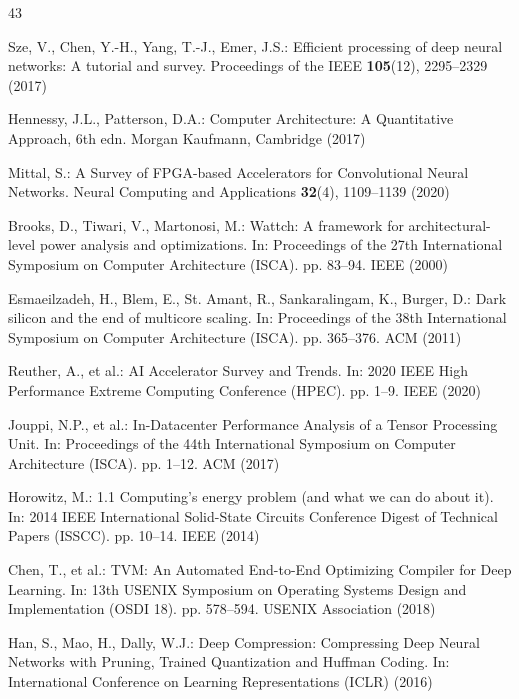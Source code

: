 \documentclass[conference]{IEEEtran}
\begin{document}
\begin{thebibliography}{43}

Sze, V., Chen, Y.-H., Yang, T.-J., Emer, J.S.: Efficient processing of deep neural networks: A tutorial and survey. Proceedings of the IEEE \textbf{105}(12), 2295--2329 (2017)

Hennessy, J.L., Patterson, D.A.: Computer Architecture: A Quantitative Approach, 6th edn. Morgan Kaufmann, Cambridge (2017)

Mittal, S.: A Survey of FPGA-based Accelerators for Convolutional Neural Networks. Neural Computing and Applications \textbf{32}(4), 1109--1139 (2020)

Brooks, D., Tiwari, V., Martonosi, M.: Wattch: A framework for architectural-level power analysis and optimizations. In: Proceedings of the 27th International Symposium on Computer Architecture (ISCA). pp. 83--94. IEEE (2000)

Esmaeilzadeh, H., Blem, E., St. Amant, R., Sankaralingam, K., Burger, D.: Dark silicon and the end of multicore scaling. In: Proceedings of the 38th International Symposium on Computer Architecture (ISCA). pp. 365--376. ACM (2011)

Reuther, A., et al.: AI Accelerator Survey and Trends. In: 2020 IEEE High Performance Extreme Computing Conference (HPEC). pp. 1--9. IEEE (2020)

Jouppi, N.P., et al.: In-Datacenter Performance Analysis of a Tensor Processing Unit. In: Proceedings of the 44th International Symposium on Computer Architecture (ISCA). pp. 1--12. ACM (2017)

Horowitz, M.: 1.1 Computing's energy problem (and what we can do about it). In: 2014 IEEE International Solid-State Circuits Conference Digest of Technical Papers (ISSCC). pp. 10--14. IEEE (2014)

Chen, T., et al.: TVM: An Automated End-to-End Optimizing Compiler for Deep Learning. In: 13th USENIX Symposium on Operating Systems Design and Implementation (OSDI 18). pp. 578--594. USENIX Association (2018)

Han, S., Mao, H., Dally, W.J.: Deep Compression: Compressing Deep Neural Networks with Pruning, Trained Quantization and Huffman Coding. In: International Conference on Learning Representations (ICLR) (2016)


\end{thebibliography}
\end{document}
